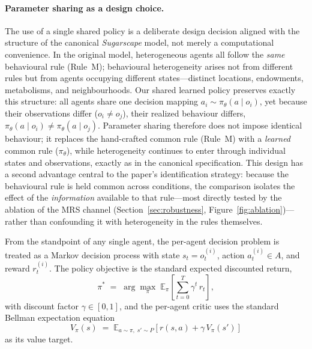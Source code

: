 \documentclass[pdflatex,sn-mathphys-num]{sn-jnl}%
\theoremstyle{thmstyleone}%
\theoremstyle{thmstyletwo}%
\theoremstyle{thmstylethree}%
\begin{document}
\paragraph{Parameter sharing as a design choice.}
The use of a single shared policy is a deliberate design decision aligned with the structure of the canonical \textit{Sugarscape} model, not merely a computational convenience.  
In the original model, heterogeneous agents all follow the \emph{same} behavioural rule (Rule~M); behavioural heterogeneity arises not from different rules but from agents occupying different states---distinct locations, endowments, metabolisms, and neighbourhoods.  
Our shared learned policy preserves exactly this structure: all agents share one decision mapping $a_i \sim \pi_\theta(a \mid o_i)$, yet because their observations differ ($o_i \neq o_j$), their realized behaviour differs, $\pi_\theta(a \mid o_i) \neq \pi_\theta(a \mid o_j)$.  
Parameter sharing therefore does not impose identical behaviour; it replaces the hand-crafted common rule (Rule~M) with a \emph{learned} common rule ($\pi_\theta$), while heterogeneity continues to enter through individual states and observations, exactly as in the canonical specification.  
This design has a second advantage central to the paper's identification strategy: because the behavioural rule is held common across conditions, the comparison isolates the effect of the \emph{information} available to that rule---most directly tested by the ablation of the MRS channel (Section~\ref{sec:robustness}, Figure~\ref{fig:ablation})---rather than confounding it with heterogeneity in the rules themselves.

From the standpoint of any single agent, the per-agent decision problem is treated as a Markov decision process with state $s_t = o_t^{(i)}$, action $a_t^{(i)} \in A$, and reward $r_t^{(i)}$.  
The policy objective is the standard expected discounted return,
\begin{equation}
\pi^* \;=\; \arg\max_{\pi}\; \mathbb{E}_{\pi}\!\left[\sum_{t=0}^{T} \gamma^{t}\, r_t\right],
\end{equation}
with discount factor $\gamma \in [0,1]$, and the per-agent critic uses the standard Bellman expectation equation
\begin{equation}
V_\pi(s) \;=\; \mathbb{E}_{a \sim \pi,\; s' \sim P}\!\left[ r(s,a) + \gamma\, V_\pi(s') \right]
\end{equation}
as its value target.
\end{document}

